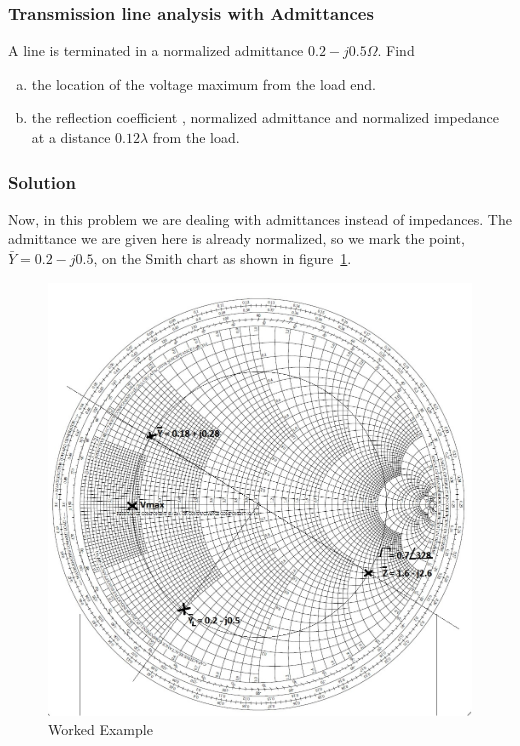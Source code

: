 \begin{exmp}
\subsubsection*{Transmission line analysis with Admittances}
A line is terminated in a normalized admittance $0.2-j0.5\varOmega$. Find 
\begin{enumerate}[(a)]
\item the location of the voltage maximum from the load end. 
\item the reflection coefficient , normalized admittance and normalized impedance at a distance $0.12\lambda$ from the load.
\end{enumerate}

\subsubsection*{Solution}
Now, in this problem we are dealing with admittances instead of impedances. The admittance we are given here is already normalized, so we mark the point, $\bar{Y} = 0.2 - j0.5$, on the Smith chart as shown in figure~\ref{fig:workedexample3}.
\begin{figure}[h]
\centering
\includegraphics[width=1\linewidth]{"./graphics/smith chart 3"}
\caption{Worked Example}
\label{fig:workedexample3}
\end{figure}


\end{exmp}
